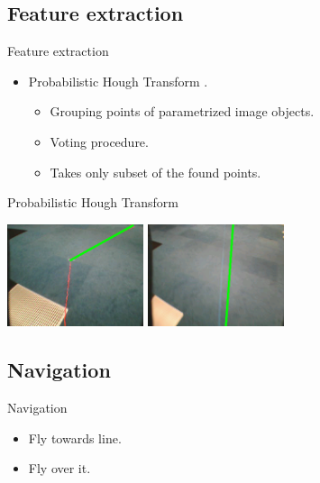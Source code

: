 \documentclass{beamer}
\begin{document}
\subsection{Feature extraction}
\begin{frame}
\begin{block}{Feature extraction}
\begin{itemize}
\item Probabilistic Hough Transform \cite{Kiryati1991}.
\begin{itemize}
\item Grouping points of parametrized image objects.
\item Voting procedure.
\item Takes only subset of the found points.
\end{itemize}
\end{itemize}
\end{block}
\end{frame}

\begin{frame}
\begin{block}{Probabilistic Hough Transform}
\begin{center}
\includegraphics[width=0.3\textwidth]{images/canny_PHT.png}
\includegraphics[width=0.3\textwidth]{images/stereo_PHT.png}
\end{center}
\end{block}
\end{frame}

\subsection{Navigation}
\begin{frame}
\begin{block}{Navigation}
\begin{itemize}
\item Fly towards line.
\item Fly over it.
\end{itemize}
\end{block}
\end{frame}
\end{document}
